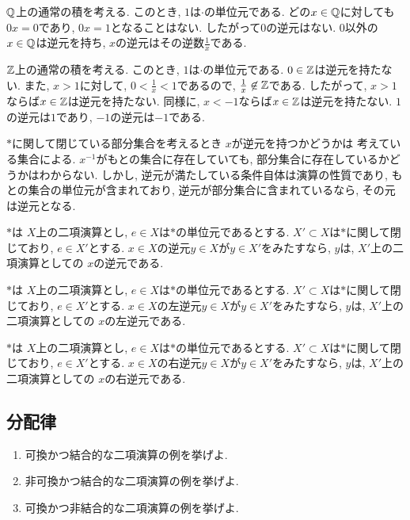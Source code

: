 \begin{example}
  $\mathbb{Q}$上の通常の積を考える.
  このとき, $1$は$\cdot$の単位元である.
  どの$x\in\mathbb{Q}$に対しても$0x=0$であり,
  $0x=1$となることはない.
  したがって$0$の逆元はない.
  $0$以外の$x\in \mathbb{Q}$は逆元を持ち,
  $x$の逆元はその逆数$\frac{1}{x}$である.
\end{example}
\begin{example}
  $\mathbb{Z}$上の通常の積を考える.
  このとき, $1$は$\cdot$の単位元である.
  $0\in\mathbb{Z}$は逆元を持たない.
  また, $x>1$に対して,
  $0<\frac{1}{x}<1$であるので,
  $\frac{1}{x}\not\in \mathbb{Z}$である.
  したがって, $x>1$ならば$x\in\mathbb{Z}$は逆元を持たない.
  同様に, $x<-1$ならば$x\in \mathbb{Z}$は逆元を持たない.
  $1$の逆元は$1$であり,
  $-1$の逆元は$-1$である.
\end{example}

$\ast$に関して閉じている部分集合を考えるとき
$x$が逆元を持つかどうかは
考えている集合による.
$x^{-1}$がもとの集合に存在していても,
部分集合に存在しているかどうかはわからない.
しかし,
逆元が満たしている条件自体は演算の性質であり,
もとの集合の単位元が含まれており,
逆元が部分集合に含まれているなら,
その元は逆元となる.
\begin{prop}
  $\ast$は
  $X$上の二項演算とし,
  $e\in X$は$\ast$の単位元であるとする.
  $X'\subset X$は$\ast$に関して閉じており,
  $e\in X'$とする.
  $x\in X$の逆元$y\in X$が$y\in X'$をみたすなら,
  $y$は,
  $X'$上の二項演算としての
  $x$の逆元である.
\end{prop}
\begin{prop}
  $\ast$は
  $X$上の二項演算とし,
  $e\in X$は$\ast$の単位元であるとする.
  $X'\subset X$は$\ast$に関して閉じており,
  $e\in X'$とする.
  $x\in X$の左逆元$y\in X$が$y\in X'$をみたすなら,
  $y$は,
  $X'$上の二項演算としての
  $x$の左逆元である.
\end{prop}
\begin{prop}
  $\ast$は
  $X$上の二項演算とし,
  $e\in X$は$\ast$の単位元であるとする.
  $X'\subset X$は$\ast$に関して閉じており,
  $e\in X'$とする.
  $x\in X$の右逆元$y\in X$が$y\in X'$をみたすなら,
  $y$は,
  $X'$上の二項演算としての
  $x$の右逆元である.
\end{prop}


\subsection{分配律}




\begin{enumerate}
\item 可換かつ結合的な二項演算の例を挙げよ.
\item 非可換かつ結合的な二項演算の例を挙げよ.
\item 可換かつ非結合的な二項演算の例を挙げよ.
\end{enumerate}



    
